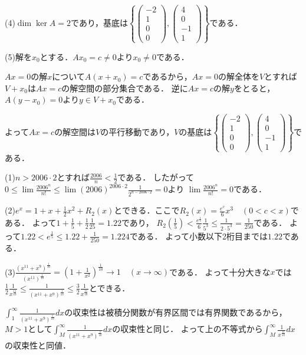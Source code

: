 \documentclass[
		book,
		head_space=20mm,
		foot_space=20mm,
		gutter=10mm,
		line_length=190mm
]{jlreq}
\begin{document}
(4)$\dim \ker A=2$であり，基底は$\left\{ \begin{pmatrix}
-2\\1\\0\\0
\end{pmatrix},\begin{pmatrix}
4\\0\\-1\\1
\end{pmatrix} \right\}$である．

(5)解を$x_0$とする．$Ax_0=c\neq 0$より$x_0\neq 0$である．

$Ax=0$の解$x$について$A(x+x_0)=c$であるから，$Ax=0$の解全体を$V$とすれば$V+x_0$は$Ax=c$の解空間の部分集合である．
逆に$Ax=c$の解$y$をとると，$A(y-x_0)=0$より$y\in V+x_0$である．

よって$Ax=c$の解空間は$V$の平行移動であり，$V$の基底は$\left\{ \begin{pmatrix}
-2\\1\\0\\0
\end{pmatrix},\begin{pmatrix}
4\\0\\-1\\1
\end{pmatrix} \right\}$である．

(1)$n>2006\cdot2$とすれば$\frac{2006}{n}<\frac{1}{2}$である．
したがって$0\le\lim \frac{2006^n}{n!}\le \lim (2006)^{2006\cdot2}\frac{1}{2^{n-2006\cdot2}}=0$より
$\lim \frac{2006^n}{n!}=0$である．

(2)$e^x=1+x+\frac{1}{2}x^2+R_2(x)$とできる．ここで$R_2(x)=\frac{e^c}{6}x^3\quad(0<c<x)$である．
よって$1+\frac{1}{5}+\frac{1}{2}\frac{1}{25}=1.22$であり，
$R_2(\frac{1}{5})<\frac{e^{\frac{1}{5}}}{6}\frac{1}{5^3}\le \frac{1}{2\cdot5^3}=\frac{1}{250}$である．
よって$1.22<e^{\frac{1}{5}}\le 1.22+\frac{1}{250}=1.224$である．
よって小数以下2桁目までは$1.22$である．

(3)$\frac{(x^{11}+x^9)^{\frac{1}{10}}}{(x^{11})^{\frac{1}{10}}}=(1+\frac{1}{x^2})^{\frac{1}{10}}\rightarrow 1\quad(x\to \infty)$である．
よって十分大きな$x$では$\frac{1}{2}\frac{1}{x^{\frac{11}{10}}}\le \frac{1}{(x^{11}+x^9)^{\frac{1}{10}}}\le \frac{3}{2}\frac{1}{x^{\frac{11}{10}}}$とできる．

$\int_1^\infty \frac{1}{(x^{11}+x^9)^{\frac{1}{10}}}dx$の収束性は被積分関数が有界区間では有界関数であるから，$M>1$として$\int_M^\infty\frac{1}{(x^{11}+x^9)^{\frac{1}{10}}}dx$の収束性と同じ．
よって上の不等式から$\int_M^\infty\frac{1}{x^{\frac{11}{10}}}dx$の収束性と同値．
\end{document}
